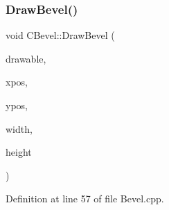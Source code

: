 \subsubsection{\texorpdfstring{Draw\+Bevel()}{DrawBevel()}}
{\footnotesize\ttfamily void C\+Bevel\+::\+Draw\+Bevel (\begin{DoxyParamCaption}\item[{Gdk\+Drawable $\ast$}]{drawable,  }\item[{gint}]{xpos,  }\item[{gint}]{ypos,  }\item[{gint}]{width,  }\item[{gint}]{height }\end{DoxyParamCaption})}



Definition at line 57 of file Bevel.\+cpp.


